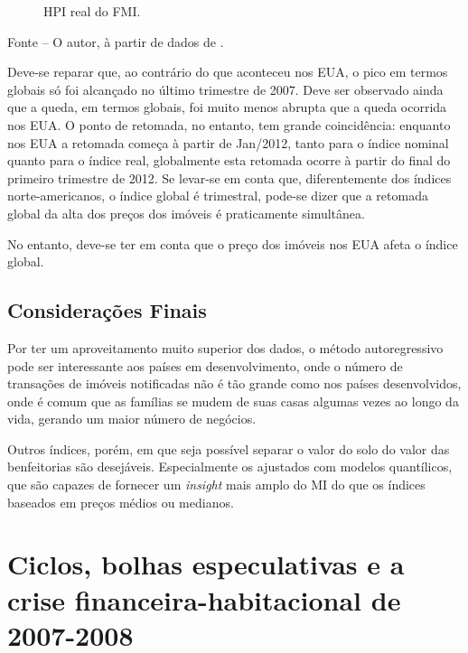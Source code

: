 \documentclass[
	12pt,				%
	oneside,			%
	a4paper,			%
	chapter=TITLE,		%
	section=TITLE,		%
	english,			%
	brazil				%
	]{abntex2}
\newcommand{\bcenter}{\begin{center}}
\newcommand{\ecenter}{\end{center}}
\begin{document}
\begin{refsection}
\begin{figure}[H]
{}

\caption{HPI real do FMI.}\label{fig:global-rhpi}
\end{figure}
\bcenter

\small Fonte -- O autor, à partir de dados de \textcite{QuandlWIKI}.
\ecenter

Deve-se reparar que, ao contrário do que aconteceu nos \gls{EUA}, o pico em
termos globais só foi alcançado no último trimestre de 2007. Deve ser observado
ainda que a queda, em termos globais, foi muito menos abrupta que a queda
ocorrida nos \gls{EUA}. O ponto de retomada, no entanto, tem grande
coincidência: enquanto nos \gls{EUA} a retomada começa à partir de Jan/2012,
tanto para o índice nominal quanto para o índice real, globalmente esta retomada
ocorre à partir do final do primeiro trimestre de 2012. Se levar-se em conta
que, diferentemente dos índices norte-americanos, o índice global é trimestral,
pode-se dizer que a retomada global da alta dos preços dos imóveis é
praticamente simultânea.

No entanto, deve-se ter em conta que o preço dos imóveis nos \gls{EUA} afeta o
índice global.

\hypertarget{considerauxe7uxf5es-finais-2}{%
\section{Considerações Finais}\label{considerauxe7uxf5es-finais-2}}

Por ter um aproveitamento muito superior dos dados, o método autoregressivo pode
ser interessante aos países em desenvolvimento, onde o número de transações de
imóveis notificadas não é tão grande como nos países desenvolvidos, onde é comum
que as famílias se mudem de suas casas algumas vezes ao longo da vida, gerando um
maior número de negócios.

Outros índices, porém, em que seja possível separar o valor do solo do valor das
benfeitorias são desejáveis. Especialmente os ajustados com modelos quantílicos,
que são capazes de fornecer um \emph{insight} mais amplo do \gls{MI} do que os índices
baseados em preços médios ou medianos.

\printbibliography[heading=subbibintoc]
\end{refsection}
\hypertarget{crise2008}{%
\chapter{Ciclos, bolhas especulativas e a crise financeira-habitacional de 2007-2008}\label{crise2008}}
\end{document}
